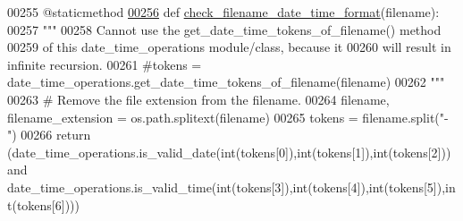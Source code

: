 \begin{DoxyCode}
00255     @staticmethod
\hypertarget{date__time__processing_8py_source_l00256}{}\hyperlink{classutilities_1_1date__time__processing_1_1date__time__operations_a3176a51995ec999ab7be5cd627019f1c}{00256}     \textcolor{keyword}{def }\hyperlink{classutilities_1_1date__time__processing_1_1date__time__operations_a3176a51995ec999ab7be5cd627019f1c}{check\_filename\_date\_time\_format}(filename):
00257         \textcolor{stringliteral}{"""}
00258 \textcolor{stringliteral}{            Cannot use the get\_date\_time\_tokens\_of\_filename() method}
00259 \textcolor{stringliteral}{                of this date\_time\_operations module/class, because it}
00260 \textcolor{stringliteral}{                will result in infinite recursion.}
00261 \textcolor{stringliteral}{            #tokens = date\_time\_operations.get\_date\_time\_tokens\_of\_filename(filename)}
00262 \textcolor{stringliteral}{        """}
00263         \textcolor{comment}{# Remove the file extension from the filename.}
00264         filename, filename\_extension = os.path.splitext(filename)
00265         tokens = filename.split(\textcolor{stringliteral}{"-"})
00266         \textcolor{keywordflow}{return} (date\_time\_operations.is\_valid\_date(int(tokens[0]),int(tokens[1]),int(tokens[2])) \textcolor{keywordflow}{and} 
      date\_time\_operations.is\_valid\_time(int(tokens[3]),int(tokens[4]),int(tokens[5]),int(tokens[6])))
\end{DoxyCode}
